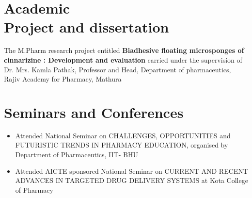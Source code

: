 \documentclass[margin,line]{res}
\begin{document}
\begin{resume}


\section{\sc Academic \\Project and dissertation}

The M.Pharm research project entitled { \bf Biadhesive floating microsponges of cinnarizine : Development and evaluation} carried under the supervision of Dr. Mrs. Kamla Pathak, Professor and Head, Department of pharmaceutics, Rajiv Academy for Pharmacy, Mathura\\



\section{\sc Seminars and Conferences}

\begin{itemize}[leftmargin=.1in]
\setlength\itemsep{-1em}

\item Attended National Seminar on CHALLENGES, OPPORTUNITIES and FUTURISTIC TRENDS IN PHARMACY EDUCATION, organised by Department of Pharmaceutics, IIT- BHU \\
\item Attended AICTE sponsored National Seminar on CURRENT AND RECENT ADVANCES IN TARGETED DRUG DELIVERY SYSTEMS at Kota College of Pharmacy \\

\end{itemize}



\end{resume}
\end{document}
